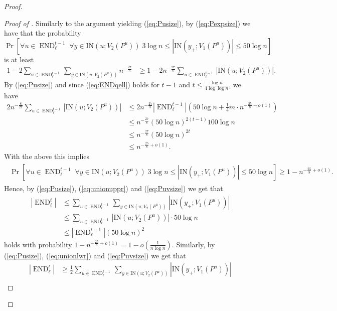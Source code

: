 \documentclass{article}
\DeclareMathOperator{\END}{END}
\newcommand{\IN}[2]{\text{IN}\left(#1; #2 \right)}
\begin{document}
\begin{proof}
\begin{proof}[Proof of ]
		Similarly to the argument yielding (\ref{eq:Pusize}), by (\ref{eq:Pexpsize}) we have that the probability
		\[\Pr\left[\forall u \in \END_{\ell}^{t-1} \; \forall y\in \IN{u}{V_2(P^u)} \; 3\log n \le \left|\IN{y_+}{V_1(P^u)} \right| \le 50\log n \right] \]
		is at least
		\begin{align*}
		1 - 2\sum_{u\in \END_{\ell}^{t-1}} \sum_{y\in \IN{u}{V_2(P^u)}} n^{-\frac{27}{8}} &\ge 1 - 2n^{-\frac{27}{8}} \sum_{u \in \END_{\ell}^{t-1}}\left|\IN{u}{V_2(P^u)} \right|.
		\end{align*}
		By (\ref{eq:Pusize}) and since (\ref{eq:ENDqell}) holds for $t-1$ and $t \le \frac{\log n}{4\log\log n}$, we have
		\begin{align*}
		2n^{-\frac{8}{27}}\sum_{u \in \END_{\ell}^{t-1}} \left|\IN{u}{V_2(P^u)} \right| &\le 2n^{-\frac{27}{8}}\left|\END_{\ell}^{t-1} \right| \left(50\log n + \tfrac{1}{4}m \cdot n^{-\frac{25}{8}+o(1)} \right) \\
		&\le n^{-\frac{27}{8}}\left(50\log n \right)^{2(t-1)} 100\log n \\
		&\le n^{-\frac{27}{8}} \left(50\log n \right)^{2t} \\
		&\le n^{-\frac{25}{8}+o(1)}.
		\end{align*}
		With the above this implies
		\begin{align}
		\begin{split}
		\label{eq:Puvsize}
		\Pr\left[\forall u \in \END_{\ell}^{t-1} \; \forall y\in \IN{u}{V_2(P^u)} \; 3\log n \le \left|\IN{y_+}{V_1(P^u)} \right| \le 50\log n \right] \ge 1 - n^{-\frac{25}{8}+o(1)}.
		\end{split}    
		\end{align}
		Hence, by (\ref{eq:Pusize}), (\ref{eq:unionuppr}) and (\ref{eq:Puvsize}) we get that
		\begin{align*}
		\left|\END_{\ell}^t \right| &\le \sum_{u \in \END_{\ell}^{t-1}} \sum_{y \in \IN{u}{V_2(P^u)}} \left|\IN{y_+}{V_1(P^u)} \right| \\
		&\le \sum_{u \in \END_{\ell}^{t-1}} \left|\IN{u}{V_2(P^u)} \right| \cdot 50\log n \\
		&\le \left|\END_{\ell}^{t-1} \right| \left(50\log n \right)^2
		\end{align*}
		holds with probability $1 - n^{-\frac{25}{8}+o(1)} = 1 - o\left(\frac{1}{n\log n} \right)$.
		Similarly, by (\ref{eq:Pusize}), (\ref{eq:unionlwr}) and (\ref{eq:Puvsize}) we get that
		\begin{align*}
		\left|\END_{\ell}^t \right| &\ge \tfrac{1}{2}\sum_{u \in \END_{\ell}^{t-1}} \sum_{y \in \IN{u}{V_2(P^u)}} \left|\IN{y_+}{V_1(P^u)} \right| \\

\end{align*}
\end{proof}
\end{proof}
\end{document}
